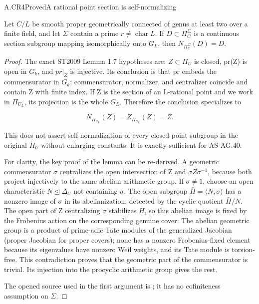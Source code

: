 \begin{claim}{A.CR4}{Proved}{A rational point section is self-normalizing}

Let $C/L$ be smooth proper geometrically connected of genus at least
two over a finite field, and let $\Sigma$ contain a prime
$r\ne\operatorname{char}L$. If $D\subset\Pi_C^\Sigma$
is a continuous section subgroup mapping isomorphically onto $G_L$,
then $N_{\Pi_C^\Sigma}(D)=D$.

\end{claim}

\begin{proof}

The exact ST2009 Lemma 1.7 hypotheses are: \(Z{\subset}{\Pi}_U\) is closed, pr(Z) is open in \(G_k\), and \(pr|_Z\) is injective. Its conclusion is that pr embeds the commensurator in \(G_k\); commensurator, normalizer, and centralizer coincide and contain Z with finite index. If Z is the section of an L-rational point and we work in \({\Pi}_{U_L}\), its projection is the whole \(G_L\). Therefore the conclusion specializes to

\[N_{\Pi_{U_L}}(Z)=Z_{\Pi_{U_L}}(Z)=Z.\]

This does not assert self-normalization of every closed-point subgroup in the original \({\Pi}_U\) without enlarging constants. It is exactly sufficient for AS-AG.40.

For clarity, the key proof of the lemma can be re-derived. A geometric commensurator \({\sigma}\) centralizes the open intersection of Z and \({\sigma}Z{\sigma}^{-1}\), because both project injectively to the same abelian arithmetic group. If \({\sigma}{\ne}1\), choose an open characteristic \(N{\trianglelefteq}{\Delta}_U\) not containing \({\sigma}\). The open subgroup \(\bar H=\langle N,\sigma\rangle\) has a nonzero image of \({\sigma}\) in its abelianization, detected by the cyclic quotient \(\bar H/N\). The open part of Z centralizing \({\sigma}\) stabilizes \(\bar H\), so this abelian image is fixed by the Frobenius action on the corresponding genuine cover. The abelian geometric group is a product of prime-adic Tate modules of the generalized Jacobian (proper Jacobian for proper covers); none has a nonzero Frobenius-fixed element because its eigenvalues have nonzero Weil weights, and its Tate module is torsion-free. This contradiction proves that the geometric part of the commensurator is trivial. Its injection into the procyclic arithmetic group gives the rest.

The opened source used in the first argument is
\cite[Lemma 1.7]{ST2009}; it has no cofiniteness assumption on \(\Sigma\).


\end{proof}

